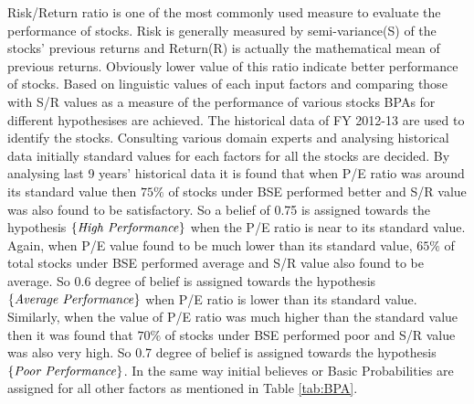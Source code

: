 \documentclass{elsarticle}
\begin{document}
Risk/Return ratio is one of the most commonly used measure to evaluate the performance of stocks. Risk is generally measured by semi-variance(S) of the stocks' previous returns and Return(R) is actually the mathematical mean of previous returns. Obviously lower value of this ratio indicate better performance of stocks. Based on linguistic values of each input factors and comparing those with S/R values as a measure of the performance of various stocks BPAs for different hypothesises are achieved. The historical data of FY 2012-13 are used to identify the stocks. Consulting various domain experts and analysing historical data initially standard values for each factors for all the stocks are decided. By analysing last 9 years' historical data it is found that when P/E ratio was around its standard value then $75\%$ of stocks under BSE performed better and S/R value was also found to be satisfactory. So a belief of 0.75 is assigned towards the hypothesis $\{\text{\emph{High Performance}}\}$ when the P/E ratio is near to its standard value. Again, when P/E value found to be much lower than its standard value, $65\%$ of total stocks under BSE performed average and S/R value also found to be average. So 0.6 degree of belief is assigned towards the hypothesis $\{\text{\emph{Average Performance}}\}$ when P/E ratio is lower than its standard value. Similarly, when the value of P/E ratio was much higher than the standard value then it was found that $70\%$ of stocks under BSE performed poor and S/R value was also very high. So 0.7 degree of belief is assigned towards the hypothesis $\{\text{\emph{Poor Performance}}\}$. In the same way initial believes or Basic Probabilities are assigned for all other factors as mentioned in Table \ref{tab:BPA}.
\end{document}
